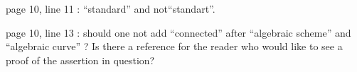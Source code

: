 page 10, line 11 : ``standard'' and not``standart''.

page 10, line 13 : should one not add ``connected'' after ``algebraic scheme'' and ``algebraic curve'' ? Is there a reference for the reader who would like to see a proof of the assertion in question?

\clearpage
